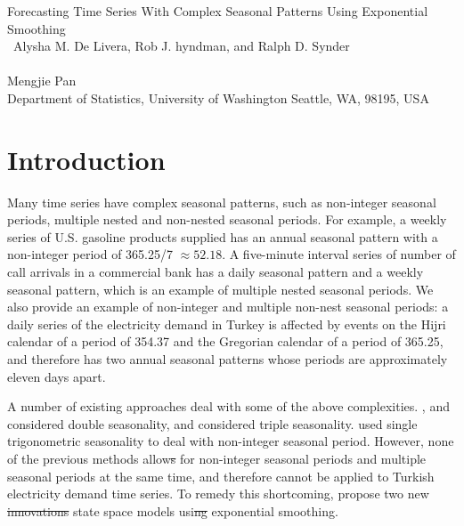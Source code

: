 \documentclass{uwstat572}
\newcommand{\vmdel}[1]{\sout{#1}}
\newcommand{\vmadd}[1]{\textbf{\color{red}{#1}}}
\begin{document}

\begin{center}
  {\LARGE Forecasting Time Series With Complex Seasonal Patterns Using Exponential Smoothing  }\\\ 
  {\large Alysha M. De Livera, Rob J. hyndman, and Ralph D. Synder}\\\ \\
  {Mengjie Pan \\ 
    Department of Statistics, University of Washington Seattle, WA, 98195, USA
  }
\end{center}



\section{Introduction}

\hspace{4ex}Many time series have complex seasonal patterns, such as non-integer seasonal periods, multiple nested and non-nested seasonal periods. For example, a weekly series of U.S. gasoline products supplied has an annual seasonal pattern with a non-integer period of 365.25/7 $\approx 52.18$. A five-minute interval series of number of call arrivals in a commercial bank has a daily seasonal pattern and a weekly seasonal pattern, which is an example of multiple nested seasonal periods. We also provide an example of non-integer and multiple non-nest seasonal periods: a daily series of the electricity demand in Turkey is affected by events on the Hijri calendar of a period of 354.37 and the Gregorian calendar of a period of 365.25, and therefore has two annual seasonal patterns whose periods are approximately eleven days apart. 

A number of existing approaches deal with some of the above complexities. \citet{pedregal2006modulated}, \citet{harvey1993forecasting}\vmadd{,} and \citet{taylor2003short} considered double seasonality, and \citet{taylor2010triple} considered triple seasonality. 
\citet{harvey1997modeling} used single trigonometric seasonality to deal with \vmadd{a} non-integer seasonal period. 
However, none of the previous methods allow\vmdel{s} for non-integer seasonal periods and multiple seasonal periods at the same time, and therefore cannot be applied to Turkish electricity demand time series. 
To remedy this shortcoming, \citet{de2011forecasting} propose two new \vmdel{innovations} state space models \vmadd{that} usi\vmadd{e}\vmdel{ng} exponential smoothing. 
\end{document}
